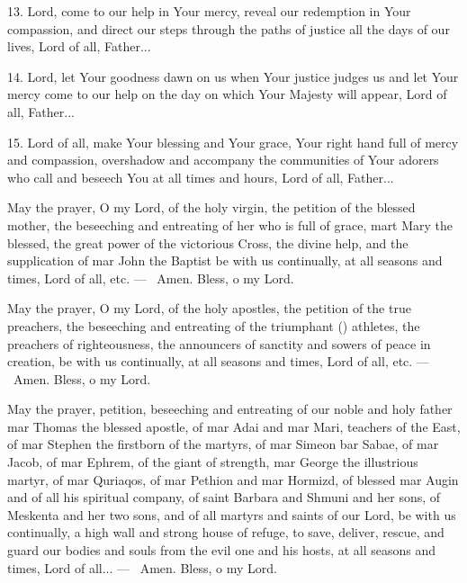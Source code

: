 \documentclass[12pt,twoside,a5paper]{article}
\begin{document}
13. Lord, come to our help in Your mercy, reveal our redemption in Your compassion, and direct our steps through the paths of justice all the days of our lives, Lord of all, Father...

14. Lord, let Your goodness dawn on us when Your justice judges us and let Your mercy come to our help on the day on which Your Majesty will appear, Lord of all, Father...

15. Lord of all, make Your blessing and Your grace, Your right hand full of mercy and compassion, overshadow and accompany the communities of Your adorers who call and beseech You at all times and hours, Lord of all, Father...




 May the prayer, O my Lord, of the holy virgin, the petition of the blessed mother, the beseeching and entreating of her who is full of grace, mart Mary the blessed, the great power of the victorious Cross, the divine help, and the supplication of mar John the Baptist be with us continually, at all seasons and times, Lord of all, etc. --- \rr~Amen. Bless, o my Lord.

 May the prayer, O my Lord, of the holy apostles, the petition of the true preachers, the beseeching and entreating of the triumphant () athletes, the preachers of righteousness, the announcers of sanctity and sowers of peace in creation, be with us continually, at all seasons and times, Lord of all, etc. --- \rr~Amen. Bless, o my Lord.

 May the prayer, petition, beseeching and entreating of our noble and holy father mar Thomas the blessed apostle, of mar Adai and mar Mari, teachers of the East, of mar Stephen the firstborn of the martyrs, of mar Simeon bar Sabae, of mar Jacob, of mar Ephrem, of the giant of strength, mar George the illustrious martyr, of mar Quriaqos, of mar Pethion and mar Hormizd, of blessed mar Augin and of all his spiritual company, of saint Barbara and Shmuni and her sons, of Meskenta and her two sons, and of all martyrs and saints of our Lord, be with us continually, a high wall and strong house of refuge, to save, deliver, rescue, and guard our bodies and souls from the evil one and his hosts, at all seasons and times, Lord of all... --- \rr~Amen. Bless, o my Lord.
\end{document}
